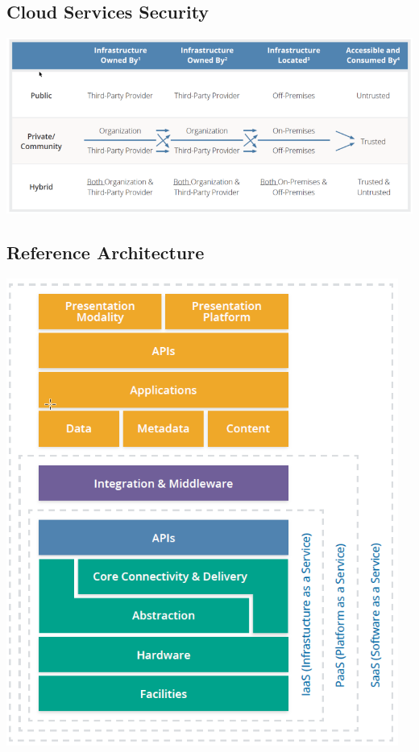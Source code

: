 \documentclass[8pt]{extarticle}
\begin{document}
\begin{multicols}{3}
\subsection{Cloud Services Security}
\includegraphics[width=\columnwidth]{cloud-service-security.png}

\subsection{Reference Architecture}
\begin{center}
    \includegraphics[width=0.6\columnwidth]{cloud-services-reference-arch.png}
\end{center}


\end{multicols}
\end{document}
